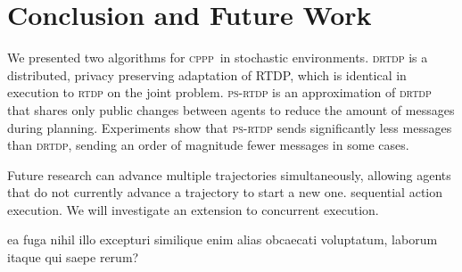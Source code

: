 \documentclass[letterpaper]{article} %
\newcommand{\mafs}{\textsc {mafs}\xspace}
\newcommand{\cppp}{\textsc {cppp}\xspace}
\newcommand{\rtdp}{\textsc {rtdp}\xspace}
\newcommand{\drtdp}{\textsc {drtdp}\xspace}
\newcommand{\psrtdp}{\textsc{ps}-\textsc{rtdp}\xspace}
\newcommand{\mdps}{\textsc {mdp}s\xspace}
\newcommand{\mdp}{\textsc {mdp}\xspace}
\theoremstyle{remark}
\newcommand{\commentout}[1]{}
\begin{document}
\commentout{
\section{Related Work}

Other methods for computing value functions for \mdps, such as value iteration and policy iteration \cite{kolobov2012planning}, and UCT \cite{kocsis2006bandit} can also be adapted to our setting. It is also interesting to explore extensions of \rtdp in this context \cite{mcmahan2005bounded,smith2006focused,bonet2001planning}.

Our methods are similar in spirit to the forward search approach popular in deterministic \cppp\ \cite{nissim2014distributed,MADLA}. Other \cppp\ approaches create first a high level public plan, that is later extended with private actions. This can be done by creating a public projection of the problem, capturing the private dependencies between actions \cite{maliah2016projections}. It is interesting to use such approaches to create a projected joint \mdp, that can be used to provide heuristic value estimates that would improve convergence.

There are additional models for multi agent decision making that build on the \mdp representation. In multi-agent \mdps (\textsc{MMDP}s) \cite{boutilier1999sequential} agents make decentralized decisions, but observed the complete state. In decentralized \mdps (Dec-\mdps) \cite[e.g.]{amato2013decentralized}, each agent observes a part of the current state. This is closer to our setting, but in Dec-\mdps agents can share information (at a cost), and have no privacy constraints. We are unaware of previous attempts to adapt \rtdp to these models.
}

\section{Conclusion and Future Work}
We presented two algorithms for \cppp\ in stochastic environments. \drtdp is a distributed, privacy preserving adaptation of RTDP, which is identical in execution to \rtdp on the joint problem. %
\psrtdp is an approximation of \drtdp that shares only public changes between agents to reduce the amount of messages during planning. Experiments show that \psrtdp sends significantly less messages than \drtdp,
sending an order of magnitude fewer messages in some cases. %
\commentout{Both \drtdp and \psrtdp advance a single trajectory in each trial. }
Future research can advance multiple trajectories simultaneously, allowing agents that do not currently advance a trajectory to start a new one. %
 sequential action execution. We will investigate an extension to concurrent execution.



 ea fuga nihil illo excepturi similique enim alias obcaecati voluptatum, laborum itaque qui saepe rerum?\clearpage

\end{document}
